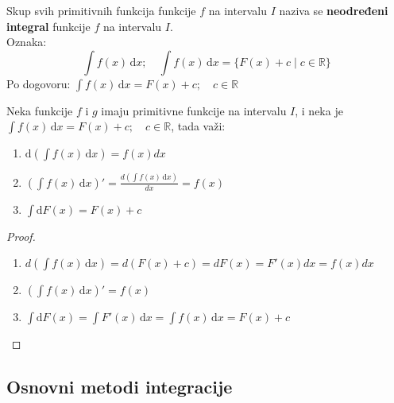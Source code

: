 \begin{definition}
	Skup svih primitivnih funkcija funkcije $f$ na intervalu $I$ naziva se \textbf{neodređeni integral} funkcije $f$ na intervalu $I$.\\
	Oznaka:
	$$ \int f(x) \, \mathrm{d}x; \quad \int f(x)\, \mathrm{d}x= \{F(x)+c\;|\;c\in\mathbb{R}\}$$
	Po dogovoru: $\int f(x)\, \mathrm{d}x = F(x)+c; \quad c \in \mathbb{R}$ 
\end{definition}

\begin{theorem}
	Neka funkcije $f$ i $g$ imaju primitivne funkcije na intervalu $I$, i neka je\\ $\int f(x)\, \mathrm{d}x = F(x) + c; \quad c \in \mathbb{R}$, tada važi:
	\begin{enumerate}
		\item $\mathrm{d}\left(\int f(x)\, \mathrm{d}x\right) = f(x)dx$
		\item $\left(\int f(x)\, \mathrm{d}x\right)'= \frac{d\left(\int f(x)\, \mathrm{d}x\right)}{dx} = f(x)$
		\item $\int \mathrm{d}F(x) = F(x) + c$
	\end{enumerate}
\end{theorem}

\begin{proof}
	\begin{enumerate}
		\item $d\left(\int f(x)\, \mathrm{d}x \right) = d(F(x) + c) = dF(x) = F'(x)dx = f(x)dx$
		\item $\left(\int f(x)\, \mathrm{d}x\right)' = f(x)$
		\item $\int \mathrm{d}F(x) = \int F'(x)\, \mathrm{d}x = \int f(x) \, \mathrm{d}x = F(x) + c$
	\end{enumerate}
\end{proof}


\subsection{Osnovni metodi integracije}

